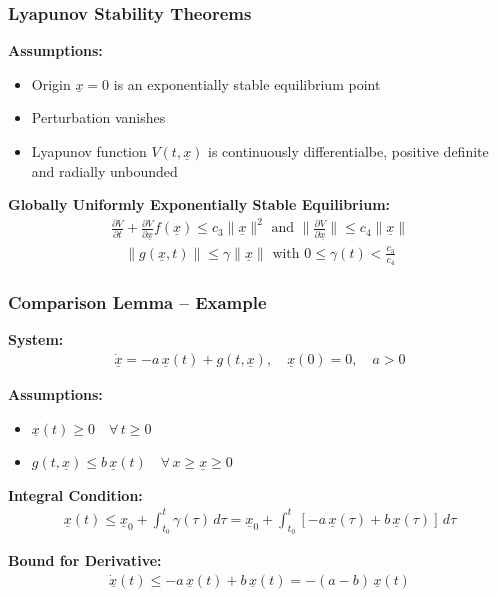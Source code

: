 \documentclass[student, noshadow, lsr, english, aspectratio=169, t]{ITR_LSR_slides}
\begin{document}
\begin{frame}
	\frametitle{Lyapunov Stability Theorems}
	\textbf{Assumptions:}
	\begin{itemize}
		\item Origin $\underline{x}=0$ is an exponentially stable equilibrium point
		\item Perturbation vanishes
		\item Lyapunov function $V(t,\underline{x})$ is continuously differentialbe, positive definite and radially unbounded
	\end{itemize}
	\vspace{0.5cm}
	\textbf{Globally Uniformly Exponentially Stable Equilibrium:}
	\begin{align*}
		\frac{\partial V}{\partial t}+\frac{\partial V}{\partial \underline{x}}f(\underline{x}) \leq c_3\|\underline{x}\|^2 \text{ and }\|\frac{\partial V}{\partial \underline{x}}\| \leq c_4\|\underline{x}\|
	\end{align*}
	\begin{align*}
		\|g(\underline{x},t)\| \leq \gamma\|\underline{x}\| \text{ with }0\leq\gamma(t)<\frac{c_3}{c_4}
	\end{align*}

\end{frame}

\begin{frame}
	\frametitle{Comparison Lemma – Example}

	\textbf{System:}
	\begin{align*}
		\dot{\underline{x}} = -a\,\underline{x}(t) + g(t, \underline{x}), \quad \underline{x}(0) = 0, \quad a > 0
	\end{align*}

	\textbf{Assumptions:}
	\begin{itemize}
		\item $\underline{x}(t) \geq 0 \quad \forall\, t \geq 0$
		\vspace{0.3em}
		\item $g(t, \underline{x}) \leq b\,\underline{x}(t) \quad \forall\, x \geq \underline{x} \geq 0$
	\end{itemize}

	\textbf{Integral Condition:}
	\begin{align*}
		\underline{x}(t) \leq \underline{x}_0 + \int_{t_0}^{t} \gamma(\tau)\, d\tau 
		= \underline{x}_0 + \int_{t_0}^{t} [-a\,\underline{x}(\tau) + b\,\underline{x}(\tau)]\, d\tau
	\end{align*}

	\textbf{Bound for Derivative:}
	\begin{align*}
		\dot{\underline{x}}(t) \leq -a\,\underline{x}(t) + b\,\underline{x}(t) = -(a - b)\,\underline{x}(t)
	\end{align*}
\end{frame}
\end{document}
